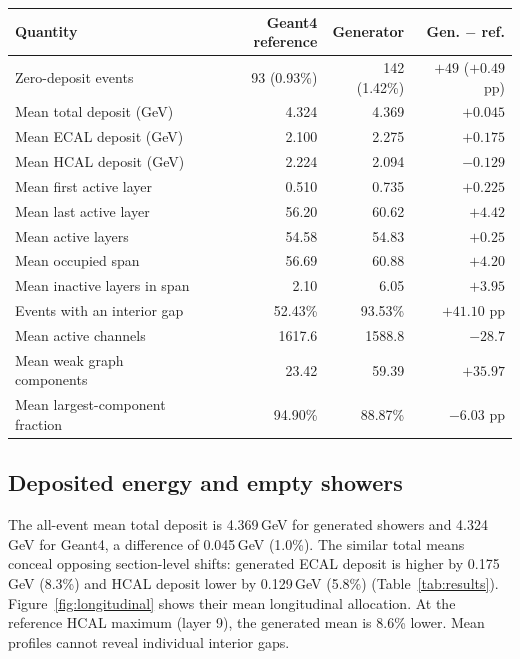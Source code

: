 \documentclass[11pt]{article}
\begin{document}
\begin{center}
\begin{minipage}{\linewidth}
\centering
{}
\label{tab:results}
\small
\begin{tabular}{@{}lrrr@{}}
\toprule
Quantity & Geant4 reference & Generator & Gen. $-$ ref. \\
\midrule
Zero-deposit events & 93 (0.93\%) & 142 (1.42\%) & $+49$ ($+0.49$ pp) \\
Mean total deposit (GeV) & 4.324 & 4.369 & $+0.045$ \\
Mean ECAL deposit (GeV) & 2.100 & 2.275 & $+0.175$ \\
Mean HCAL deposit (GeV) & 2.224 & 2.094 & $-0.129$ \\
\midrule
Mean first active layer & 0.510 & 0.735 & $+0.225$ \\
Mean last active layer & 56.20 & 60.62 & $+4.42$ \\
Mean active layers & 54.58 & 54.83 & $+0.25$ \\
Mean occupied span & 56.69 & 60.88 & $+4.20$ \\
Mean inactive layers in span & 2.10 & 6.05 & $+3.95$ \\
Events with an interior gap & 52.43\% & 93.53\% & $+41.10$ pp \\
Mean active channels & 1617.6 & 1588.8 & $-28.7$ \\
Mean weak graph components & 23.42 & 59.39 & $+35.97$ \\
Mean largest-component fraction & 94.90\% & 88.87\% & $-6.03$ pp \\
\bottomrule
\end{tabular}
\end{minipage}
\end{center}

\subsection{Deposited energy and empty showers}

The all-event mean total deposit is 4.369\,GeV for generated showers and 4.324\,GeV for Geant4, a difference of 0.045\,GeV (1.0\%). The similar total means conceal opposing section-level shifts: generated ECAL deposit is higher by 0.175\,GeV (8.3\%) and HCAL deposit lower by 0.129\,GeV (5.8\%) (Table~\ref{tab:results}). Figure~\ref{fig:longitudinal} shows their mean longitudinal allocation. At the reference HCAL maximum (layer 9), the generated mean is 8.6\% lower. Mean profiles cannot reveal individual interior gaps.
\end{document}
